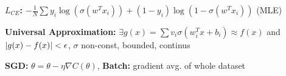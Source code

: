\textbf{$L_{CE}$:} $- \frac{1}{N} \sum y_i \log (\sigma(w^T x_i)) + (1 - y_i) \log (1 - \sigma(w^T x_i))$ (MLE)\\
\begin{comment}
	\Note{Cross-entropy loss is a maximum likelihood estimator}\\
	\textbf{Assumption:} y's are Bernoulli $Ber(\sigma(w^T x))$ distributed.
	From there we maximise the weights over the probability:\\
	 $P(D|w) = \prod^N \sigma(w^T x_i)^{y_i} (1 - \sigma(w^T x_i))^{1 - y_i}$.\\
	Taking the negative log-likelihood results in the given loss.\\
\end{comment}

\textbf{Universal Approximation:} $\exists g(x) = \sum v_i \sigma(w_i^T x + b_i) \approx f(x)$ and $\left\lvert g(x) - f(x) \right\rvert < \epsilon$, $\sigma$ non-const, bounded, continus\\
\begin{comment}
	\textbf{Intuition:} We can create bumps with only two hidden neurons, having a lot of neurons can create many bumps to approximate any function.\\
 	\Note{$\sigma: \R \rightarrow \R$ must be non-constant, bounded and continous}\\
 	\Note{$f \in [0,1]^m$, e.g. must be in the m-dimensional hypercube}\\
\end{comment}

\textbf{SGD:} $\theta = \theta - \eta \nabla C(\theta)$, \textbf{Batch:} gradient avg. of whole dataset\\
\begin{comment}
	SGD has more fluctuations and will never reach the minimum, but dances around it.
	The convergence is usually faster though, since it updates the parameters more often\\
	Batch is doing one update per epoch, inefficient if there are a lot of samples in the dataset\\
\end{comment}



 
 


